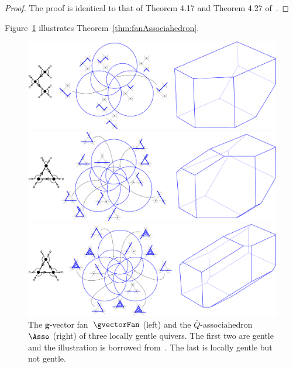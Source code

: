 \documentclass{amsart}
\theoremstyle{definition}
\renewcommand{\b}[1]{\mathbf{#1}} %
\newcommand{\fref}[1]{Figure~\ref{#1}} %
\begin{document}
\begin{proof}
The proof is identical to that of Theorem 4.17 and Theorem 4.27 of~\cite{PaluPilaudPlamondon}.
\end{proof}

\fref{fig:fanAssociahedron} illustrates Theorem~\ref{thm:fanAssociahedron}.

\begin{figure}[p]
	\capstart
	\centerline{\includegraphics[scale=.5]{fanAssociahedron1}}
	\vspace{.5cm}
	\centerline{\includegraphics[scale=.5]{fanAssociahedron2}}
	\vspace{.5cm}
	\centerline{\includegraphics[scale=.5]{fanAssociahedron3}}
	\caption{The $\b{g}$-vector fan~$\gvectorFan$ (left) and the $\bar Q$-associahedron~$\Asso$ (right) of three locally gentle quivers. The first two are gentle and the illustration is borrowed from~\cite{PaluPilaudPlamondon}. The last is locally gentle but not gentle.}
	\label{fig:fanAssociahedron}
\end{figure}




\label{sec:biblio}
\end{document}

